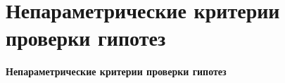 \documentclass[11pt,pdf,utf8,hyperref={unicode},aspectratio=169]{beamer}
\begin{document}
\section{Непараметрические критерии проверки гипотез}
\begin{frame}{}{}
    \centering
    \huge
    \bfseries
    Непараметрические критерии проверки гипотез
\end{frame}
\end{document}
